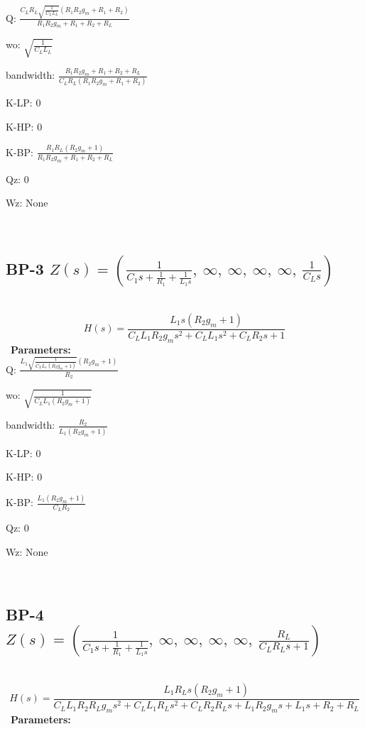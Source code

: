 \documentclass{article}
\begin{document}
Q: $\frac{C_{L} R_{L} \sqrt{\frac{1}{C_{L} L_{L}}} \left(R_{1} R_{2} g_{m} + R_{1} + R_{2}\right)}{R_{1} R_{2} g_{m} + R_{1} + R_{2} + R_{L}}$\ 

wo: $\sqrt{\frac{1}{C_{L} L_{L}}}$\ 

bandwidth: $\frac{R_{1} R_{2} g_{m} + R_{1} + R_{2} + R_{L}}{C_{L} R_{L} \left(R_{1} R_{2} g_{m} + R_{1} + R_{2}\right)}$\ 

K-LP: $0$\ 

K-HP: $0$\ 

K-BP: $\frac{R_{1} R_{L} \left(R_{2} g_{m} + 1\right)}{R_{1} R_{2} g_{m} + R_{1} + R_{2} + R_{L}}$\ 

Qz: $0$\ 

Wz: $\text{None}$\ 

\ 

\subsection{BP-3 $Z(s) = \left( \frac{1}{C_{1} s + \frac{1}{R_{1}} + \frac{1}{L_{1} s}}, \  \infty, \  \infty, \  \infty, \  \infty, \  \frac{1}{C_{L} s}\right)$ } \ 
\textbf{\[H(s) = \frac{L_{1} s \left(R_{2} g_{m} + 1\right)}{C_{L} L_{1} R_{2} g_{m} s^{2} + C_{L} L_{1} s^{2} + C_{L} R_{2} s + 1}\] } \ 
\textbf{Parameters:}\\ 

Q: $\frac{L_{1} \sqrt{\frac{1}{C_{L} L_{1} \left(R_{2} g_{m} + 1\right)}} \left(R_{2} g_{m} + 1\right)}{R_{2}}$\ 

wo: $\sqrt{\frac{1}{C_{L} L_{1} \left(R_{2} g_{m} + 1\right)}}$\ 

bandwidth: $\frac{R_{2}}{L_{1} \left(R_{2} g_{m} + 1\right)}$\ 

K-LP: $0$\ 

K-HP: $0$\ 

K-BP: $\frac{L_{1} \left(R_{2} g_{m} + 1\right)}{C_{L} R_{2}}$\ 

Qz: $0$\ 

Wz: $\text{None}$\ 

\ 

\subsection{BP-4 $Z(s) = \left( \frac{1}{C_{1} s + \frac{1}{R_{1}} + \frac{1}{L_{1} s}}, \  \infty, \  \infty, \  \infty, \  \infty, \  \frac{R_{L}}{C_{L} R_{L} s + 1}\right)$ } \ 
\textbf{\[H(s) = \frac{L_{1} R_{L} s \left(R_{2} g_{m} + 1\right)}{C_{L} L_{1} R_{2} R_{L} g_{m} s^{2} + C_{L} L_{1} R_{L} s^{2} + C_{L} R_{2} R_{L} s + L_{1} R_{2} g_{m} s + L_{1} s + R_{2} + R_{L}}\] } \ 
\textbf{Parameters:}\\ 
\end{document}
